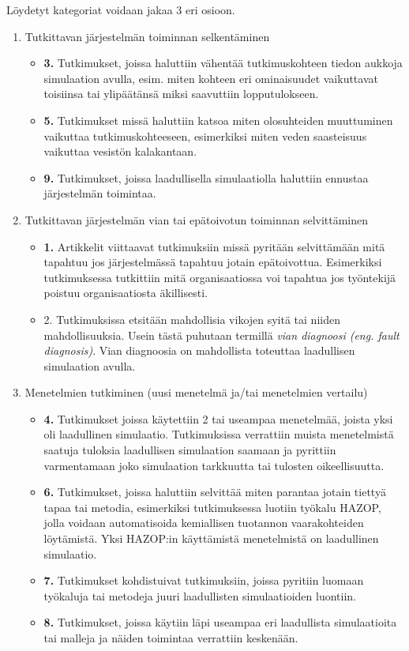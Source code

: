 \documentclass[utf8]{gradu3}
\begin{document}
Löydetyt kategoriat voidaan jakaa 3 eri osioon.

\begin{enumerate}
    \item Tutkittavan järjestelmän toiminnan selkentäminen
    \begin{itemize}
        \item \textbf{3.} Tutkimukset, joissa haluttiin vähentää tutkimuskohteen tiedon aukkoja simulaation avulla, esim. miten kohteen eri ominaisuudet vaikuttavat toisiinsa tai ylipäätänsä miksi saavuttiin lopputulokseen.
        \item \textbf{5.} Tutkimukset missä haluttiin katsoa miten olosuhteiden muuttuminen vaikuttaa tutkimuskohteeseen, esimerkiksi miten veden saasteisuus vaikuttaa vesistön kalakantaan.
        \item \textbf{9.} Tutkimukset, joissa laadullisella simulaatiolla haluttiin ennustaa järjestelmän toimintaa.
    \end{itemize}
    \item Tutkittavan järjestelmän vian tai epätoivotun toiminnan selvittäminen
    \begin{itemize}
        \item \textbf{1.} Artikkelit viittaavat tutkimuksiin missä pyritään selvittämään mitä tapahtuu jos järjestelmässä tapahtuu jotain epätoivottua. Esimerkiksi tutkimuksessa \cite{hu2015cusp} tutkittiin mitä organisaatiossa voi tapahtua jos työntekijä poistuu organisaatiosta äkillisesti.
        \item 2. Tutkimuksissa etsitään mahdollisia vikojen syitä tai niiden mahdollisuuksia. Usein tästä puhutaan termillä \textit{ vian diagnoosi (eng. fault diagnosis)}. Vian diagnoosia on mahdollista toteuttaa laadullisen simulaation avulla.
    \end{itemize}
    \item Menetelmien tutkiminen (uusi menetelmä ja/tai menetelmien vertailu)
    \begin{itemize}
        \item \textbf{4.} Tutkimukset joissa käytettiin 2 tai useampaa menetelmää, joista yksi oli laadullinen simulaatio. Tutkimuksissa verrattiin muista menetelmistä saatuja tuloksia laadullisen simulaation saamaan ja pyrittiin varmentamaan joko simulaation tarkkuutta tai tulosten oikeellisuutta.
        \item \textbf{6.} Tutkimukset, joissa haluttiin selvittää miten parantaa jotain tiettyä tapaa tai metodia, esimerkiksi tutkimuksessa \textcite{zhang2015automatic} luotiin työkalu HAZOP, jolla voidaan automatisoida kemiallisen tuotannon vaarakohteiden löytämistä. Yksi HAZOP:in käyttämistä menetelmistä on laadullinen simulaatio.
        \item \textbf{7.} Tutkimukset kohdistuivat tutkimuksiin, joissa pyritiin luomaan työkaluja tai metodeja juuri laadullisten simulaatioiden luontiin.
        \item \textbf{8.} Tutkimukset, joissa käytiin läpi useampaa eri laadullista simulaatioita tai malleja ja näiden toimintaa verrattiin keskenään.
    \end{itemize}
\end{enumerate}
\end{document}
